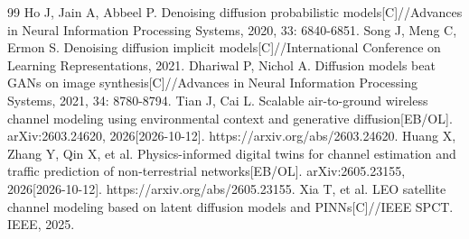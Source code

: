 \documentclass[12pt, a4paper]{ctexart}
\begin{document}
\begin{thebibliography}{99}
 Ho J, Jain A, Abbeel P. Denoising diffusion probabilistic models[C]//Advances in Neural Information Processing Systems, 2020, 33: 6840-6851.
 Song J, Meng C, Ermon S. Denoising diffusion implicit models[C]//International Conference on Learning Representations, 2021.
 Dhariwal P, Nichol A. Diffusion models beat GANs on image synthesis[C]//Advances in Neural Information Processing Systems, 2021, 34: 8780-8794.
 Tian J, Cai L. Scalable air-to-ground wireless channel modeling using environmental context and generative diffusion[EB/OL]. arXiv:2603.24620, 2026[2026-10-12]. https://arxiv.org/abs/2603.24620.
 Huang X, Zhang Y, Qin X, et al. Physics-informed digital twins for channel estimation and traffic prediction of non-terrestrial networks[EB/OL]. arXiv:2605.23155, 2026[2026-10-12]. https://arxiv.org/abs/2605.23155.
 Xia T, et al. LEO satellite channel modeling based on latent diffusion models and PINNs[C]//IEEE SPCT. IEEE, 2025.
\end{thebibliography}
\end{document}
